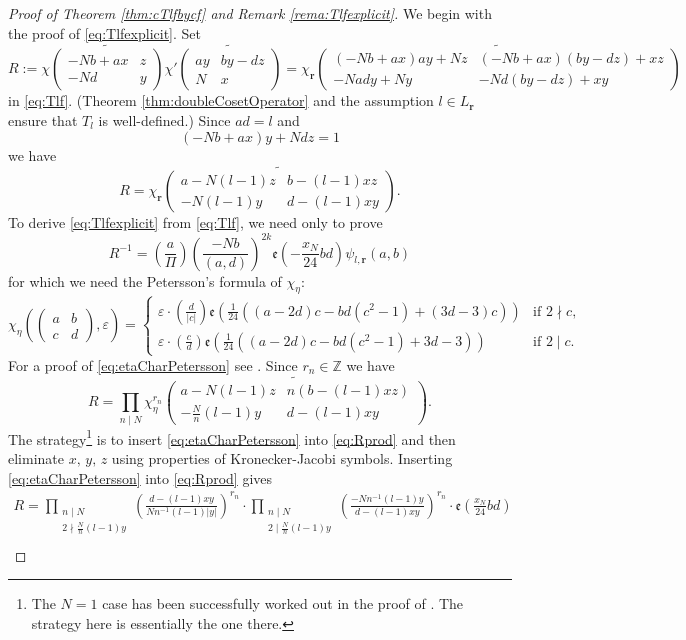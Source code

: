 \documentclass[12pt]{amsart}
\numberwithin{equation}{section}
\theoremstyle{plain}
\theoremstyle{definition}
\theoremstyle{remark}
\newcommand\twoscript[2]{\substack{{#1} \\ {#2}}}
\newcommand\legendre[2]{\genfrac{(}{)}{}{}{#1}{#2}}
\newcommand\tbtmat[4]{\left(\begin{smallmatrix}{#1} & {#2} \\ {#3} & {#4}\end{smallmatrix}\right)}
\newcommand*\abs[1]{\lvert#1\rvert}
\newcommand\etp[1]{\mathfrak{e}\left(#1\right)}
\newcommand\numZ{\mathbb{Z}}
\begin{document}
\begin{proof}[Proof of Theorem \ref{thm:cTlfbycf} and Remark \ref{rema:Tlfexplicit}]
We begin with the proof of \eqref{eq:Tlfexplicit}. Set
$$
R:=\chi\widetilde{\tbtmat{-Nb+ax}{z}{-Nd}{y}}\chi'\widetilde{\tbtmat{ay}{by-dz}{N}{x}}=\chi_\mathbf{r}\widetilde{\tbtmat{(-Nb+ax)ay+Nz}{(-Nb+ax)(by-dz)+xz}{-Nady+Ny}{-Nd(by-dz)+xy}}
$$
in \eqref{eq:Tlf}. (Theorem \ref{thm:doubleCosetOperator} and the assumption $l\in L_\mathbf{r}$ ensure that $T_l$ is well-defined.) Since $ad=l$ and
\begin{equation}
\label{eq:xyz1}
(-Nb+ax)y+Ndz=1
\end{equation}
we have
\begin{equation*}
R=\chi_\mathbf{r}\widetilde{\tbtmat{a-N(l-1)z}{b-(l-1)xz}{-N(l-1)y}{d-(l-1)xy}}.
\end{equation*}
To derive \eqref{eq:Tlfexplicit} from \eqref{eq:Tlf}, we need only to prove
\begin{equation}
\label{eq:toProveIncTlfbycf}
R^{-1}=\legendre{a}{\varPi}\legendre{-Nb}{(a,d)}^{2k}\etp{-\frac{x_N}{24}bd}\psi_{l,\mathbf{r}}(a,b)
\end{equation}
for which we need the Petersson's formula of $\chi_\eta$:
\begin{equation}
\label{eq:etaCharPetersson}
\chi_\eta\left(\tbtmat{a}{b}{c}{d},\varepsilon\right)=\begin{cases}
\varepsilon\cdot\legendre{d}{\abs{c}}\etp{\frac{1}{24}\left((a-2d)c-bd(c^2-1)+(3d-3)c\right)}   & \text{if }2 \nmid c, \\
\varepsilon\cdot\legendre{c}{d}\etp{\frac{1}{24}\left((a-2d)c-bd(c^2-1)+3d-3\right)}   & \text{if }2 \mid c.
\end{cases}
\end{equation}
For a proof of \eqref{eq:etaCharPetersson} see \cite{Kno70}. Since $r_n\in\numZ$ we have
\begin{equation}
\label{eq:Rprod}
R=\prod_{n\mid N}\chi_\eta^{r_n}\widetilde{\tbtmat{a-N(l-1)z}{n(b-(l-1)xz)}{-\frac{N}{n}(l-1)y}{d-(l-1)xy}}.
\end{equation}
The strategy\footnote{The $N=1$ case has been successfully worked out in the proof of \cite[Lemma 5.2]{ZZ23}. The strategy here is essentially the one there.} is to insert \eqref{eq:etaCharPetersson} into \eqref{eq:Rprod} and then eliminate $x,\,y,\,z$ using properties of Kronecker-Jacobi symbols. Inserting \eqref{eq:etaCharPetersson} into \eqref{eq:Rprod} gives
\begin{multline}
\label{eq:Rexpression}
R=\prod_{\twoscript{n\mid N}{2\nmid\frac{N}{n}(l-1)y}}\legendre{d-(l-1)xy}{Nn^{-1}(l-1)\abs{y}}^{r_n}\cdot\prod_{\twoscript{n\mid N}{2\mid\frac{N}{n}(l-1)y}}\legendre{-Nn^{-1}(l-1)y}{d-(l-1)xy}^{r_n}\cdot\etp{\frac{x_N}{24}bd}\\

\end{multline}
\end{proof}
\end{document}
